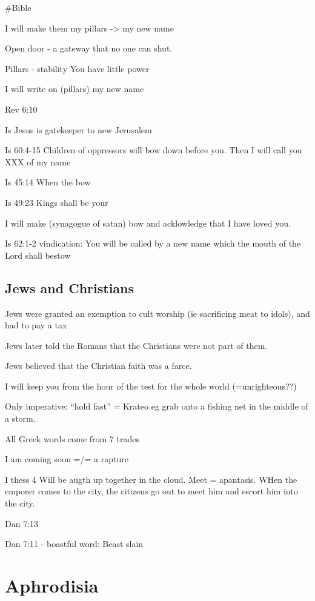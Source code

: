 \documentclass[
]{book}
\begin{document}
\#Bible

I will make them my pillars -\textgreater{} my new name

Open door - a gateway that no one can shut.

Pillars - stability
You have little power

I will write on (pillars) my new name

Rev 6:10

Is Jesus is gatekeeper to new Jerusalem

Is 60:4-15 Children of oppressors will bow down before you. Then I will call you XXX of my name

Is 45:14 When the bow

Is 49:23 Kings shall be your

I will make (synagogue of satan) bow and acklowledge that I have loved you.

Is 62:1-2 vindication: You will be called by a new name which the mouth of the Lord shall bestow

\hypertarget{jews-and-christians}{%
\section{Jews and Christians}\label{jews-and-christians}}

Jews were granted an exemption to cult worship (ie sacrificing meat to idols), and had to pay a tax

Jews later told the Romans that the Christians were not part of them.

Jews believed that the Christian faith was a farce.

I will keep you from the hour of the test for the whole world (=unrighteous??)

Only imperative: ``hold fast'' = Krateo eg grab onto a fishing net in the middle of a storm.

All Greek words come from 7 trades

I am coming soon =/= a rapture

I thess 4 Will be augth up together in the cloud. Meet = apantasis. WHen the emporer comes to the city, the citizens go out to meet him and escort him into the city.

Dan 7:13

Dan 7:11 - boastful word: Beast slain

\hypertarget{aphrodisia}{%
\chapter{Aphrodisia}\label{aphrodisia}}
\end{document}

